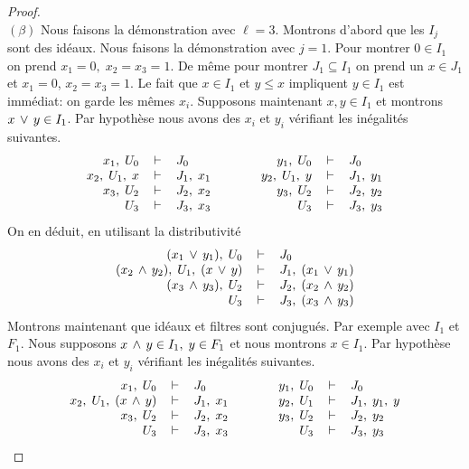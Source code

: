 \begin{proof}
\\
$(\beta)$
Nous faisons la démonstration avec $\ell=3$.
Montrons d'abord que les $I_j$  sont des idéaux.
Nous faisons la démonstration avec $j=1$.
Pour montrer $0\in I_1$ on prend
\hbox{$x_1=0,\; x_2=x_3=1$}. De même pour montrer $J_1\subseteq  I_1$ on prend 
un
$x\in J_1$ et $x_1=0$, \hbox{$x_2=x_3=1$}.
Le fait que $x\in I_1$  et $y\leq x$ impliquent $y\in I_1$ est
immédiat:
on garde les mêmes $x_i$. Supposons maintenant $x,y\in I_1$ et
montrons
$x\vu y\in I_1$. Par hypothèse nous avons des $x_i$  et $y_i$
vérifiant
les inégalités suivantes.
$$\begin{array}{rclcrcl}
 x_1,\; U_0& \vda  & J_0  &\qquad &
 y_1,\; U_0& \vda  & J_0  \\
 x_2,\; U_1,\; x& \vda  & J_1 ,\; x_1  &&
 y_2,\; U_1,\; y& \vda  & J_1 ,\; y_1  \\
 x_3,\; U_{2}& \vda  & J_{2} ,\; x_{2}  &&
 y_3,\; U_{2}& \vda  & J_{2} ,\; y_{2}  \\
 U_3& \vda  & J_3 ,\; x_3  &&
 U_3& \vda  & J_3 ,\; y_3
\end{array}$$
On en déduit, en utilisant la distributivité
$$\begin{array}{rclcrcl}
 (x_1\vu y_1),\; U_0& \vda  & J_0   \\
 (x_2\vi y_2),\; U_1,\; (x\vu y)& \vda &J_1,\;(x_1\vu y_1)\\
 (x_3\vi y_3),\; U_{2}& \vda  & J_{2} ,\; (x_2\vi y_2)  \\
 U_3& \vda  & J_3 ,\; (x_3\vi y_3)  \\
\end{array}$$
Montrons maintenant que idéaux et filtres sont conjugués. Par exemple
avec $I_1$  et $F_1$. Nous supposons  $x\vi y\in I_1,\; y\in F_1$ et
nous montrons  $x\in I_1$.
Par hypothèse nous avons des $x_i$  et $y_i$  vérifiant les
inégalités suivantes.
$$\begin{array}{rclcrcl}
 x_1,\; U_0& \vda  & J_0  &\qquad &
 y_1,\; U_0& \vda  & J_0  \\
 x_2,\; U_1,\; (x \vi y)& \vda  & J_1 ,\; x_1  &&
 y_2,\; U_1& \vda  & J_1 ,\; y_1 ,\; y \\
 x_3,\; U_{2}& \vda  & J_{2} ,\; x_{2}  &&
 y_3,\; U_{2}& \vda  & J_{2} ,\; y_{2}  \\
 U_3& \vda  & J_3 ,\; x_3  &&
 U_3& \vda  & J_3 ,\; y_3

\end{array}$$
\end{proof}

